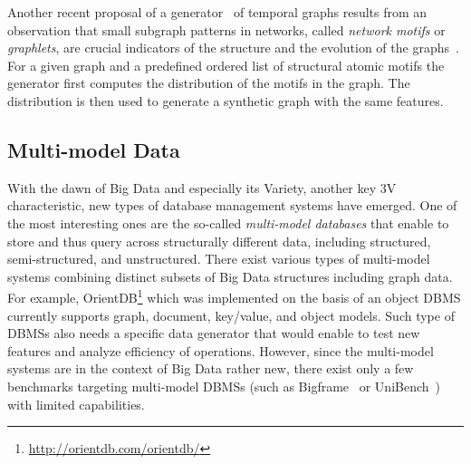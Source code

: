 Another recent proposal of a generator~\cite{mlg2018_42} of temporal graphs
results from an observation that small subgraph patterns in networks, called
\emph{network motifs} or \emph{graphlets}, are crucial indicators of the
structure and the evolution of the
graphs~\cite{Paranjape:2017:MTN:3018661.3018731}. For a given graph and a
predefined ordered list of structural atomic motifs the generator first computes
the distribution of the motifs in the graph. The distribution is then used to
generate a synthetic graph with the same features.




\subsection{Multi-model Data}
With the dawn of Big Data and especially its Variety, another key 3V characteristic, new types of
database management systems have emerged. One of the most interesting ones
are the so-called \emph{multi-model databases} that enable to store and
thus query across structurally different data, including structured, semi-structured, and unstructured. There exist various types of
multi-model systems combining  distinct subsets of Big Data structures including graph data.
For example, OrientDB\footnote{\url{http://orientdb.com/orientdb/}} which was
implemented on the basis of an object DBMS currently supports graph, document,
key/value, and object models. Such type of DBMSs also needs a specific
data generator that would enable
to test new features and analyze efficiency of operations. However, since the
multi-model systems are in the context of Big Data rather new, there exist only
a few benchmarks targeting multi-model DBMSs (such as
Bigframe~\cite{journals/pvldb/KunjirKB14} or UniBench~\cite{conf/cidr/lu17})
with limited capabilities.


